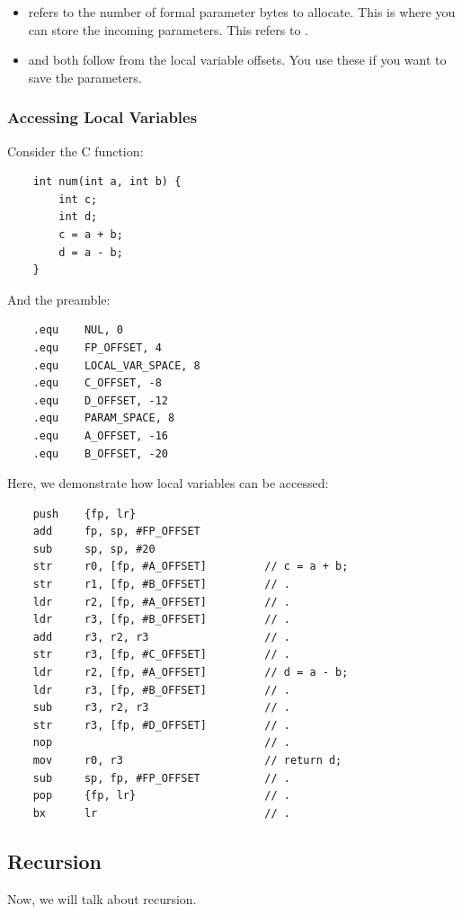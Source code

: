 \documentclass[letterpaper]{article}
\begin{document}
\begin{itemize}
\begin{center}
    \end{center}
    \item {} refers to the number of formal parameter bytes to allocate. This is where you can store the incoming parameters. This refers to . 
    \item {} and  both follow from the local variable offsets. You use these if you want to save the parameters. 
\end{itemize}

\subsubsection{Accessing Local Variables}
Consider the C function:
\begin{verbatim}
    int num(int a, int b) {
        int c; 
        int d; 
        c = a + b; 
        d = a - b; 
    }
\end{verbatim}
And the preamble:
\begin{verbatim}
    .equ    NUL, 0
    .equ    FP_OFFSET, 4 
    .equ    LOCAL_VAR_SPACE, 8 
    .equ    C_OFFSET, -8 
    .equ    D_OFFSET, -12 
    .equ    PARAM_SPACE, 8 
    .equ    A_OFFSET, -16 
    .equ    B_OFFSET, -20 
\end{verbatim}
Here, we demonstrate how local variables can be accessed: 
\begin{verbatim}
    push    {fp, lr}
    add     fp, sp, #FP_OFFSET 
    sub     sp, sp, #20
    str     r0, [fp, #A_OFFSET]         // c = a + b; 
    str     r1, [fp, #B_OFFSET]         // . 
    ldr     r2, [fp, #A_OFFSET]         // . 
    ldr     r3, [fp, #B_OFFSET]         // . 
    add     r3, r2, r3                  // .
    str     r3, [fp, #C_OFFSET]         // .
    ldr     r2, [fp, #A_OFFSET]         // d = a - b;
    ldr     r3, [fp, #B_OFFSET]         // .
    sub     r3, r2, r3                  // .
    str     r3, [fp, #D_OFFSET]         // .
    nop                                 // .
    mov     r0, r3                      // return d; 
    sub     sp, fp, #FP_OFFSET          // .
    pop     {fp, lr}                    // .
    bx      lr                          // .
\end{verbatim}

\subsection{Recursion}
Now, we will talk about recursion. 
\end{document}
